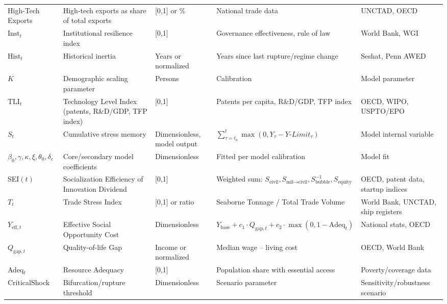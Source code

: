 \documentclass[12pt]{report}
\begin{document}
\begin{longtable}{|p{2.8cm}|p{4.3cm}|p{2.0cm}|p{3.0cm}|p{3.0cm}|}
High-Tech Exports & High-tech exports as share of total exports & [0,1] or \% & National trade data & UNCTAD, OECD \\
$\text{Inst}_t$ & Institutional resilience index & [0,1] & Governance effectiveness, rule of law & World Bank, WGI \\
$\text{Hist}_t$ & Historical inertia & Years or normalized & Years since last rupture/regime change & Seshat, Penn AWED \\
$K$ & Demographic scaling parameter & Persons & Calibration & Model parameter \\
$\text{TLI}_t$ & Technology Level Index (patents, R\&D/GDP, TFP index) & [0,1] & Patents per capita, R\&D/GDP, TFP index & OECD, WIPO, USPTO/EPO \\
$S_t$ & Cumulative stress memory & Dimensionless, model output & $\sum_{\tau=t_0}^t \max(0, Y_\tau - Y\text{-}Limit_\tau)$ & Model internal variable \\
$\beta_0, \gamma, \kappa, \xi, \theta_0, \delta_c$ & Core/secondary model coefficients & Dimensionless & Fitted per model calibration & Model fit \\
SEI$(t)$ & Socialization Efficiency of Innovation Dividend & [0,1] & Weighted sum: $S_\text{civil}, S_{\text{mil}\rightarrow\text{civil}}, S_\text{bubble}^{-1}, S_\text{equity}$ & OECD, patent data, startup indices \\
$T_t$ & Trade Stress Index & [0,1] or ratio & Seaborne Tonnage / Total Trade Volume & World Bank, UNCTAD, ship registers \\
$Y_{\text{eff},t}$ & Effective Social Opportunity Cost & Dimensionless & $Y_{\text{base}} + c_1 \cdot Q_{\text{gap},t} + c_2 \cdot \max(0,1 - \text{Adeq}_t)$ & National stats, OECD \\
$Q_{\text{gap},t}$ & Quality-of-life Gap & Income or normalized & Median wage – living cost & OECD, World Bank \\
Adeq$_t$ & Resource Adequacy & [0,1] & Population share with essential access & Poverty/coverage data \\
CriticalShock & Bifurcation/rupture threshold & Dimensionless & Scenario parameter & Sensitivity/robustness scenario \\
\end{longtable}
\end{document}
